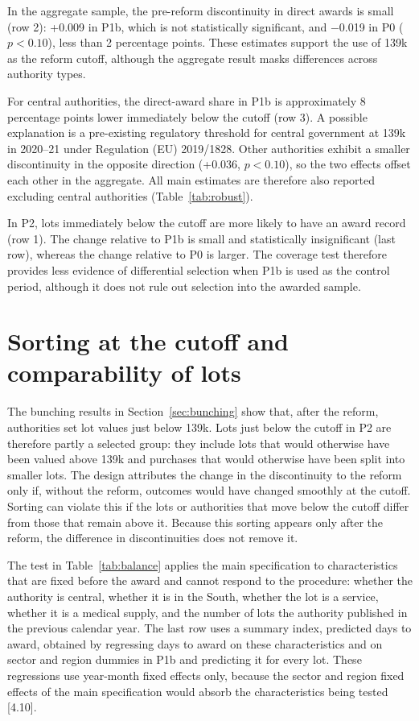 \documentclass[11pt,a4paper]{article}
\newcommand{\sect}[1]{\textsf{\small [#1]}}
\begin{document}
In the aggregate sample, the pre-reform discontinuity in direct awards is small (row 2): +0.009 in P1b, which is not statistically significant, and $-$0.019 in P0 ($p<0.10$), less than 2 percentage points. These estimates support the use of \texteuro139k as the reform cutoff, although the aggregate result masks differences across authority types.

For central authorities, the direct-award share in P1b is approximately 8 percentage points lower immediately below the cutoff (row 3). A possible explanation is a pre-existing regulatory threshold for central government at \texteuro139k in 2020--21 under Regulation (EU) 2019/1828. Other authorities exhibit a smaller discontinuity in the opposite direction (+0.036, $p<0.10$), so the two effects offset each other in the aggregate. All main estimates are therefore also reported excluding central authorities (Table~\ref{tab:robust}).

In P2, lots immediately below the cutoff are more likely to have an award record (row 1). The change relative to P1b is small and statistically insignificant (last row), whereas the change relative to P0 is larger. The coverage test therefore provides less evidence of differential selection when P1b is used as the control period, although it does not rule out selection into the awarded sample.

\section{Sorting at the cutoff and comparability of lots}
\label{sec:balance}

The bunching results in Section~\ref{sec:bunching} show that, after the reform, authorities set lot values just below \texteuro139k. Lots just below the cutoff in P2 are therefore partly a selected group: they include lots that would otherwise have been valued above \texteuro139k and purchases that would otherwise have been split into smaller lots. The design attributes the change in the discontinuity to the reform only if, without the reform, outcomes would have changed smoothly at the cutoff. Sorting can violate this if the lots or authorities that move below the cutoff differ from those that remain above it. Because this sorting appears only after the reform, the difference in discontinuities does not remove it.

The test in Table~\ref{tab:balance} applies the main specification to characteristics that are fixed before the award and cannot respond to the procedure: whether the authority is central, whether it is in the South, whether the lot is a service, whether it is a medical supply, and the number of lots the authority published in the previous calendar year. The last row uses a summary index, predicted days to award, obtained by regressing days to award on these characteristics and on sector and region dummies in P1b and predicting it for every lot. These regressions use year-month fixed effects only, because the sector and region fixed effects of the main specification would absorb the characteristics being tested \sect{4.10}.
\end{document}
